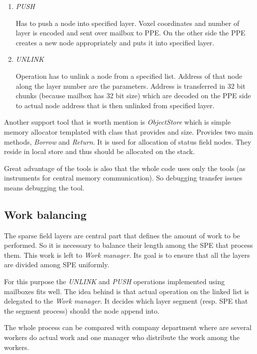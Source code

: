\begin{enumerate}
\item \emph{PUSH}
\par
Has to push a node into specified layer.
Voxel coordinates and number of layer is encoded and sent over mailbox to PPE.
On the other side the PPE creates a new node appropriately and puts it into specified layer.

\item \emph{UNLINK}
\par
Operation has to unlink a node from a specified list.
Address of that node along the layer number are the parameters.
Address is transferred in 32 bit chunks (because mailbox has 32 bit size) which are decoded on the PPE side to actual node address that is then unlinked from specified layer.
\end{enumerate}

\par
Another support tool that is worth mention is \emph{ObjectStore} which is simple memory allocator templated with class that provides and size.
Provides two main methods, \emph{Borrow} and \emph{Return}.
It is used for allocation of status field nodes.
They reside in local store and thus should be allocated on the stack.

\par
Great advantage of the tools is also that the whole code uses only the tools (as instruments for central memory communication).
So debugging transfer issues means debugging the tool.

\subsection{Work balancing}

\par
The sparse field layers are central part that defines the amount of work to be performed.
So it is necessary to balance their length among the SPE that process them.
This work is left to \emph{Work manager}.
Its goal is to ensure that all the layers are divided among SPE uniformly.

\par
For this purpose the \emph{UNLINK} and \emph{PUSH} operations implemented using mailboxes fits well.
The idea behind is that actual operation on the linked list is delegated to the \emph{Work manager}.
It decides which layer segment (resp. SPE that the segment process) should the node append into.

\par
The whole process can be compared with company department where are several workers do actual work and one manager who distribute the work among the workers.

